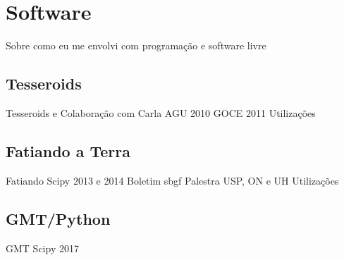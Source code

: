 \section{Software}


Sobre como eu me envolvi com programação e software livre


\subsection{Tesseroids}

Tesseroids e Colaboração com Carla
AGU 2010
GOCE 2011
Utilizações


\subsection{Fatiando a Terra}

Fatiando
Scipy 2013 e 2014
Boletim sbgf
Palestra USP, ON e UH
Utilizações


\subsection{GMT/Python}

GMT
Scipy  2017
